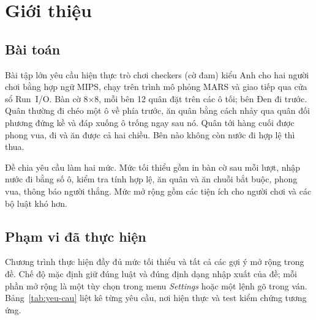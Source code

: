 \chapter{Giới thiệu}

\section{Bài toán}

Bài tập lớn yêu cầu hiện thực trò chơi checkers (cờ đam) kiểu Anh cho hai người chơi bằng hợp ngữ MIPS, chạy trên trình mô phỏng MARS và giao tiếp qua cửa sổ Run~I/O. Bàn cờ 8$\times$8, mỗi bên 12 quân đặt trên các ô tối; bên Đen đi trước. Quân thường đi chéo một ô về phía trước, ăn quân bằng cách nhảy qua quân đối phương đứng kề và đáp xuống ô trống ngay sau nó. Quân tới hàng cuối được phong vua, đi và ăn được cả hai chiều. Bên nào không còn nước đi hợp lệ thì thua.

Đề chia yêu cầu làm hai mức. Mức tối thiểu gồm in bàn cờ sau mỗi lượt, nhập nước đi bằng số ô, kiểm tra tính hợp lệ, ăn quân và ăn chuỗi bắt buộc, phong vua, thông báo người thắng. Mức mở rộng gồm các tiện ích cho người chơi và các bộ luật khó hơn.

\section{Phạm vi đã thực hiện}

Chương trình thực hiện đầy đủ mức tối thiểu và tất cả các gợi ý mở rộng trong đề. Chế độ mặc định giữ đúng luật và đúng định dạng nhập xuất của đề; mỗi phần mở rộng là một tùy chọn trong menu \emph{Settings} hoặc một lệnh gõ trong ván. Bảng~\ref{tab:yeu-cau} liệt kê từng yêu cầu, nơi hiện thực và test kiểm chứng tương ứng.

